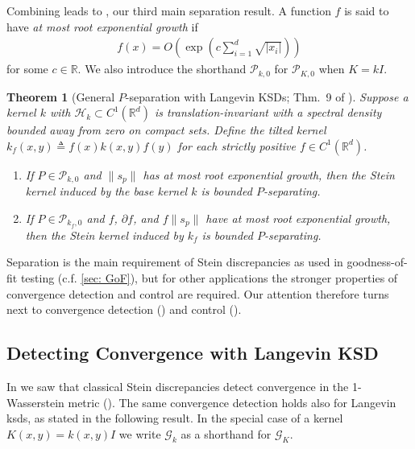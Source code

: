 \documentclass[12pt,paper=letter]{scrreprt}
\newtheorem{theorem}{Theorem}[chapter]
\newcommand{\sss}[1]{\scriptscriptstyle{#1}}
\def\defeq{\triangleq} %
\newcommand{\Pset}[0]{\mathcal{P}} %
\renewcommand{\k}{k}
\newcommand{\kb}{\k} %
\newcommand{\Kb}{K} %
\newcommand{\embedtozero}[1][\Kb]{\Pset_{\!\sss{#1,0}}}
\def\H{\mathcal{H}}
\begin{document}
Combining  leads to , our third main separation result.
A function $f$ is said to have \emph{at most root exponential growth} if 
\begin{align}
f(x) = O \left( \exp \left( c\sum_{i=1}^d \sqrt{|x_i|} \right) \right) \label{eq: root exponential growth}
\end{align} 
for some $c \in \mathbb{R}$.
We also introduce the shorthand $\mathcal{P}_{k,0}$ for $\mathcal{P}_{K,0}$ when $K = k I$.

\begin{theorem}[General $P$-separation with Langevin KSDs; Thm.~9 of \citealp{barp2022targeted}]
\label{Stein kernel control tight convergence via bounded P separation}
Suppose a kernel $\k$ with $\H_{\k} \subset C^1(\mathbb{R}^d)$ is translation-invariant with a spectral density bounded away from zero on compact sets.
Define the tilted kernel $k_f( x, y) \defeq f(x)\kb(x,y)f(y)$ for each
strictly positive $f \in C^1(\mathbb{R}^d)$.
\begin{enumerate}[label=\textup{(\alph*)}]
 \item If $P\in\embedtozero[\kb]$  and
$\| s_p \|$ has at most root exponential growth, then the Stein kernel induced by the base kernel $k$ is bounded $P$-separating. 
    \item If $P\in \mathcal{P}_{k_f,0}$  and  $f$, $\partial f$, and $f \| s_p \|$ have at most root exponential growth, then the Stein kernel induced by $k_f$ is bounded $P$-separating.
\end{enumerate}
\end{theorem}

Separation is the main requirement of Stein discrepancies as used in goodness-of-fit testing (c.f. \cref{sec: GoF}), but for other applications the stronger properties of convergence detection and control are required.
Our attention therefore turns next to convergence detection () and control ().




\subsection{Detecting Convergence with Langevin KSD}
\label{subsec: conv det lksd}

In  we saw that classical Stein discrepancies detect convergence in the 1-Wasserstein metric ().
The same convergence detection holds also for Langevin \acp{ksd}, as stated in the following result.
In the special case of a kernel $K(x,y) = k(x,y) I$ we write $\mathcal{G}_k$ as a shorthand for $\mathcal{G}_K$.
\end{document}
